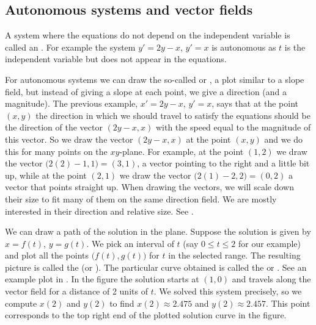 \subsection{Autonomous systems and vector fields}

A system where the equations do not depend on the independent variable
is called an \emph{}.  For example
the system $y'=2y-x$, $y'=x$ is autonomous as $t$ is the independent
variable but does not appear in the equations.

For autonomous systems we can draw the so-called
\emph{} or \emph{},
a plot similar to a slope field, but
instead of giving a slope at each point, we give a direction (and a
magnitude).  The previous example, $x' = 2y-x$, $y' = x$, says
that at the point $(x,y)$ the direction in which we should travel to satisfy
the equations should be the direction of the vector $( 2y-x, x )$
with the speed equal to the magnitude of this vector.  So we draw
the vector $(2y-x,x)$ at the point $(x,y)$ and we do this for
many points on the $xy$-plane.
For example, at the point $(1,2)$ we draw the vector
$\bigl(2(2)-1,1\bigr) = (3,1)$,
a vector pointing to the right and a little bit up,
while at the point $(2,1)$ we draw the vector $\bigl(2(1)-2,2\bigr) = (0,2)$
a vector that points straight up.
When drawing the vectors, we will scale down
their size to fit many of them on the same direction field.  We are mostly 
interested in their direction and relative size.  See
.

We can draw a path of the solution in the plane.  Suppose the
solution is given by $x = f(t)$, $y=g(t)$.  We pick an interval
of $t$ (say $0 \leq t \leq 2$ for our example) and plot all the points
$\bigl(f(t),g(t)\bigr)$ for $t$ in the selected range.  The resulting picture is
called the \emph{}
(or ).
The particular curve obtained
is called the \emph{} or \emph{}.
See an example plot in .
In the figure the solution starts at $(1,0)$ and travels along the vector field
for a distance of 2 units of $t$.  We solved this system precisely, so
we compute $x(2)$ and $y(2)$ to find
$x(2) \approx 2.475$ and $y(2) \approx 2.457$.  This point corresponds
to the top right end of the plotted solution curve in the figure.

\begin{myfig}
\parbox[t]{3.0in}{
 \capstart
 \caption{The direction field for $x' = 2y-x$, $y' = x$.%
 \label{sintro-vectorfield:fig}}
}
\quad
\parbox[t]{3.0in}{
 \capstart
 \caption{The direction field for $x' = 2y-x$, $y' = x$ with
 the trajectory of the solution starting at $(1,0)$
 for $0 \leq t \leq 2$.%
 \label{sintro-vectorfield-sol:fig}}
}
\end{myfig}



